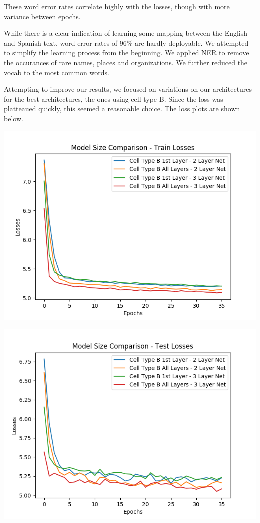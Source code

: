 \documentclass[letterpaper, 10pt]{article}
\begin{document}
\begin{multicols}{2}
These word error rates correlate highly with the losses, though with more variance between epochs.

While there is a clear indication of learning some mapping between the English and Spanish text,
word error rates of 96\% are hardly deployable.
We attempted to simplify the learning process from the beginning.
We applied NER to remove the occurances of rare names, places and organizations.
We further reduced the vocab to the most common words.

Attempting to improve our results, we focused on variations on our architectures for the best
architectures, the ones using cell type B.
Since the loss was platteaued quickly, this seemed a reasonable choice.
The loss plots are shown below.

\begin{center}
\includegraphics[scale=.4]{size_comparison_losses_train}
\end{center}

\begin{center}
\includegraphics[scale=.4]{size_comparison_losses_test}
\end{center}


\end{multicols}
\end{document}
